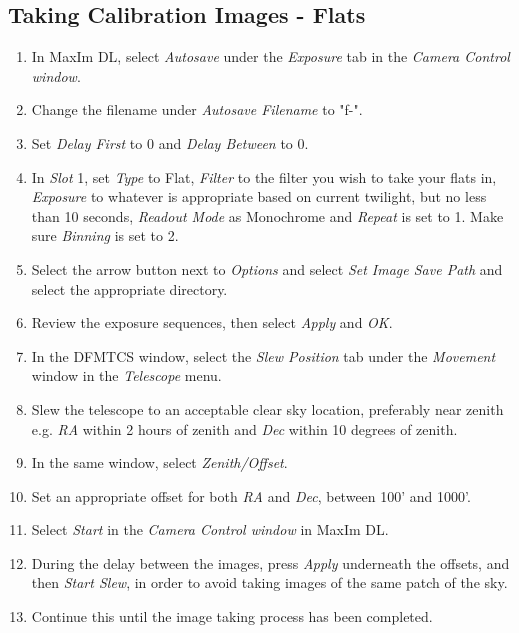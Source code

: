 \documentclass[letterpaper,12pt]{article}
\begin{document}
\subsection{Taking Calibration Images - Flats}
\begin{enumerate}
	\item In MaxIm DL, select \textit{Autosave} under the \textit{Exposure} tab in the \textit{Camera Control window}.
	
	\item Change the filename under \textit{Autosave Filename} to "f-".
	\item Set \textit{Delay First} to 0 and \textit{Delay Between} to 0.
	\item In \textit{Slot} 1, set \textit{Type} to Flat, \textit{Filter} to the filter you wish to take your flats in, \textit{Exposure} to whatever is appropriate based on current twilight, but no less than 10 seconds, \textit{Readout Mode} as Monochrome and \textit{Repeat} is set to 1. Make sure \textit{Binning} is set to 2.
	\item Select the arrow button next to \textit{Options} and select \textit{Set Image Save Path} and select the appropriate directory.
	\item Review the exposure sequences, then select \textit{Apply} and \textit{OK}.
	\item In the DFMTCS window, select the \textit{Slew Position} tab under the \textit{Movement} window in the \textit{Telescope} menu.
	\item Slew the telescope to an acceptable clear sky location, preferably near zenith e.g. \textit{RA} within 2 hours of zenith and \textit{Dec} within 10 degrees of zenith. 
	\item In the same window, select \textit{Zenith/Offset}.
	\item Set an appropriate offset for both \textit{RA} and \textit{Dec}, between 100' and 1000'.
	\item Select \textit{Start} in the \textit{Camera Control window} in MaxIm DL.
	\item During the delay between the images, press \textit{Apply} underneath the offsets, and then \textit{Start Slew}, in order to avoid taking images of the same patch of the sky.
	\item Continue this until the image taking process has been completed.
\end{enumerate}
\end{document}
